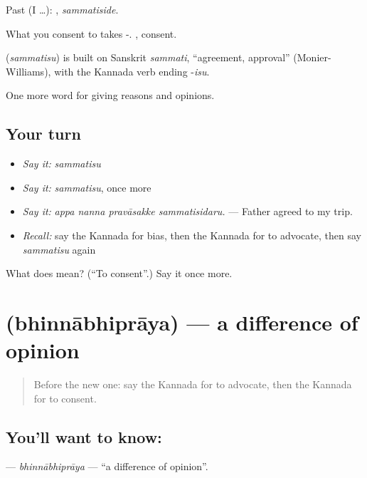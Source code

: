Past (I …): , \emph{sammatiside}.

What you consent to takes -. , consent.

\begin{cousinweb}
\textbf{} (\emph{sammatisu}) is built on Sanskrit \emph{sammati}, \textquotedblleft{}agreement, approval\textquotedblright{} (Monier-Williams), with the Kannada verb ending -\emph{isu}.
\end{cousinweb}

\begin{grammarlens}[title={What you've built}]
One more word for giving reasons and opinions.
\end{grammarlens}

\subsection*{Your turn}
\begin{itemize}
\raggedright
  \item \emph{Say it:} \emph{sammatisu}
  \item \emph{Say it:} \emph{sammatisu}, once more
  \item \emph{Say it:} \emph{appa nanna pravāsakke sammatisidaru.} — Father agreed to my trip.
  \item \emph{Recall:} say the Kannada for bias, then the Kannada for to advocate, then say \emph{sammatisu} again
\end{itemize}

\begin{tcolorbox}[breakable,colback=teal!4,colframe=teal!35!black,title={Before you move on}]
What does  mean? (\textquotedblleft{}To consent\textquotedblright{}.) Say it once more.
\end{tcolorbox}
\section[\texorpdfstring{\kn{ಭಿನ್ನಾಭಿಪ್ರಾಯ} (bhinnābhiprāya)}{ಭಿನ್ನಾಭಿಪ್ರಾಯ (bhinnābhiprāya)}]{ (bhinnābhiprāya) — a difference of opinion}

\label{lesson:KA-C379-bhinnabhipraya}



\begin{quote}
Before the new one: say the Kannada for to advocate, then the Kannada for to consent.
\end{quote}

\subsection*{You'll want to know: }
\textbf{} — \emph{bhinnābhiprāya} — \textquotedblleft{}a difference of opinion\textquotedblright{}.

